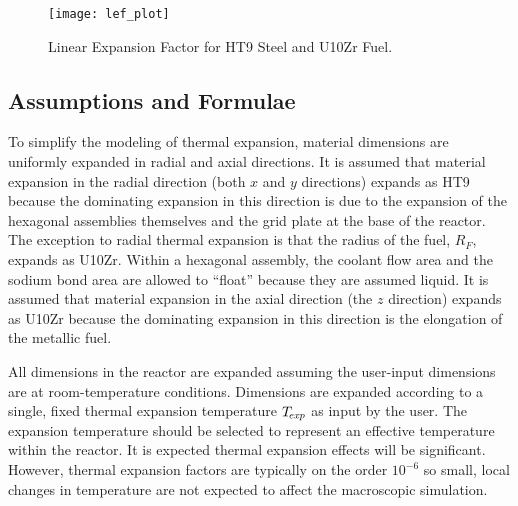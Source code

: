     \begin{figure}
      \centering
      \texttt{[image: lef\_plot]}
      \caption{Linear Expansion Factor for HT9 Steel and U10Zr Fuel.}
      \label{fig:lef_plot}
    \end{figure}
    
  \subsection{Assumptions and Formulae}
  \label{sec:model_details__assumptions_and_formulae}
    To simplify the modeling of thermal expansion, material dimensions are
    uniformly expanded in radial and axial directions. It is assumed that 
    material expansion in the radial direction (both $x$ and $y$ directions) 
    expands as HT9 because the dominating expansion in this direction is due to 
    the expansion of the hexagonal assemblies themselves and the grid plate at
    the base of the reactor. The exception to radial thermal expansion is that 
    the radius of the fuel, $R_F$, expands as U10Zr.  Within a hexagonal 
    assembly, the coolant flow area and the sodium bond area are allowed to 
    ``float'' because they are assumed liquid.  It is assumed that material 
    expansion in the axial direction (the $z$ direction) expands as U10Zr 
    because the dominating expansion in this direction is the elongation of the 
    metallic fuel. 
    
    All dimensions in the reactor are expanded assuming the user-input 
    dimensions are at room-temperature conditions. Dimensions are expanded
    according to a single, fixed thermal expansion temperature $T_{\!\mbox{\scriptsize \em exp}}$ as input
    by the user. The expansion temperature should be selected to represent an 
    effective temperature within the reactor. It is expected thermal expansion 
    effects will be significant. However, thermal expansion factors are 
    typically on the order $10^{-6}$ so small, local changes in temperature are 
    not expected to affect the macroscopic simulation.

